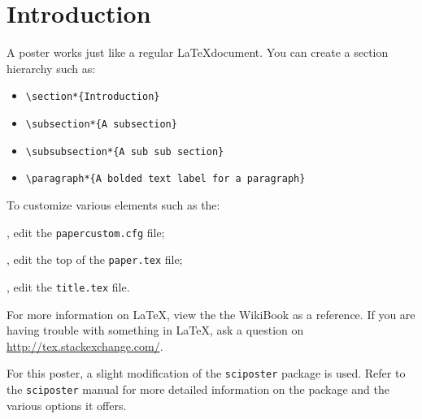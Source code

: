 
\section*{Introduction}
A poster works just like a regular \LaTeX document.  You can create a section
hierarchy such as:
\begin{itemize}
  \setlength{\itemindent}{1em}
  \item \verb+\section*{Introduction}+
  \item \verb+\subsection*{A subsection}+
  \item \verb+\subsubsection*{A sub sub section}+
  \item \verb+\paragraph*{A bolded text label for a paragraph}+
\end{itemize}

\noindent To customize various elements such as the:
\begin{description}
  \setlength{\itemindent}{1em}
  \item[Poster size], edit the \verb+papercustom.cfg+ file;
  \item[Title, authors, etc.], edit the top of the \verb+paper.tex+ file;
  \item[Title format], edit the \verb+title.tex+ file.
\end{description}

\noindent For more information on \LaTeX, view the the WikiBook \citet{wikibook:latex} as a reference.
If you are having trouble with something in \LaTeX, ask a question on \url{http://tex.stackexchange.com/}.

For this poster, a slight modification of the \verb+sciposter+ \citep{website:sciposter} package is used.
Refer to the \verb+sciposter+ manual \citep{manual:sciposter} for more detailed information on the package and the various options it offers.
